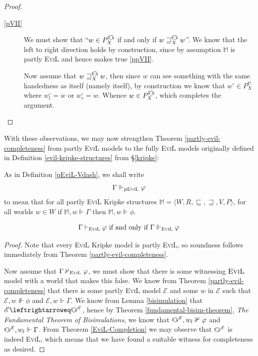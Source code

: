 \begin{proof}
\begin{description}
\item[\ref{pVII}]  We must show that ``$w \in P_X^\invis$ if
  and only if $w \sqsupseteq^\invis_X w$''. We know that the
  left to right direction holds by construction, since by assumption
  $\mathbb{M}$ is partly \textsc{EviL} and hence makes true
  \ref{ppVII}.

  Now assume that  $w \sqsupseteq^\invis_X w$, then since $w$ can see
  something with the same handedness as itself (namely itself), 
by construction we know that $w^\circ \in P_X^\mathbb{M}$ where $w^\circ_l = w$ or
$w^\circ_r=w$.  Whence $w \in P^\invis_X$, which completes the argument.
\end{description}
\end{proof}

With these observations, we may now strengthen Theorem
\ref{partly-evil-completeness} from partly \textsc{EviL} models to
the fully \textsc{EviL} models originally defined in
Definition \ref{evil-kripke-structures} from \S\ref{kripke}:

\begin{definition}\label{EviL-Vdash}
As in Definition \ref{pEviL-Vdash}, we shall write
\[ \Gamma \Vdash_{\textup{p\textsc{EviL}}} \phi \]
to mean that for all partly \textsc{EviL} Kripke structures
$\mathbb{M} = \langle W, R, \sqsubseteq, \sqsupseteq, V, P \rangle$,
for all worlds $w \in W$ if $\mathbb{M},w \Vdash \Gamma$ then $\mathbb{M},w \Vdash \phi$.
\end{definition}

\begin{theorem}\label{evil-completeness}
$$\Gamma \vdash_{\textsc{EviL}} \phi\textup{ if and only if }\Gamma
\Vdash_{\textup{\textsc{EviL}}} \phi$$
\end{theorem}
\begin{proof}
Note that every \textsc{EviL} Kripke model is partly
\textsc{EviL}, so soundness follows immediately from Theorem
\ref{partly-evil-completeness}.

Now assume that $\Gamma \nvdash_{\textsc{EviL}} \phi$, we must show
that there is some witnessing $\textsc{EviL}$ model with a world that
makes this false.   We know from Theorem
\ref{partly-evil-completeness} that there is 
some partly \textsc{EviL} model $\mathscr{E}$ and some
$w$ in $\mathscr{E}$ such that $\mathscr{E},w \nVdash \phi$ and $\mathscr{E},w \Vdash \Gamma$.  We
know from Lemma \ref{bisimulation} that $\mathscr{E} \leftrightarroweq
\invis^\mathscr{E}$, hence by Theorem \ref{fundamental-bisim-theorem},
\emph{The Fundamental Theorem of Bisimulations}, we know that
$\invis^\mathscr{E},w_l \nVdash \phi$ and 
$\invis^\mathscr{E},w_l \Vdash \Gamma$.  
From Theorem \ref{EviL-Completion} 
we may observe that  $\invis^\mathscr{E}$ is
indeed \textsc{EviL}, which means that we have found a suitable
witness for completeness as desired.
\end{proof}

